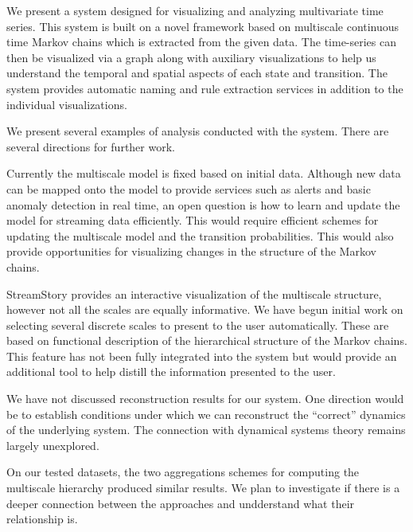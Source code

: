 We present a system designed for visualizing and analyzing multivariate time series. This system is built on a novel framework based on multiscale continuous time Markov chains which is extracted from the given data. The time-series can then be visualized via a graph along with auxiliary visualizations to help us understand the temporal and spatial aspects of each state and transition. The system provides automatic naming and rule extraction services in addition to the individual visualizations.  

We present several examples of analysis conducted with the system.  There are several directions for further work. 

 Currently the multiscale model is fixed based on initial data. Although new data can be mapped onto the model to provide services such as alerts and basic anomaly detection in real time, an open question is how to learn and update the model for streaming data efficiently. This would require efficient schemes for updating the multiscale model and the transition probabilities. This would also provide opportunities for visualizing changes in the structure of the Markov chains.

 StreamStory provides an interactive visualization of the multiscale structure, however not all the scales are equally informative.  We have begun initial work on selecting several discrete scales to present to the user automatically. These are based on functional description of the hierarchical structure of the Markov chains. This feature has not been fully integrated into the system but would provide an additional tool to help distill the  information presented to the user. 

 We have not discussed reconstruction results for our system. One direction would be to establish conditions under which we can reconstruct the ``correct'' dynamics of the underlying system. The connection with dynamical systems theory remains largely unexplored.

 On our tested datasets, the two aggregations schemes for computing the multiscale hierarchy produced similar results. We plan to investigate if there is a deeper connection between the approaches and undderstand what their relationship is. 






